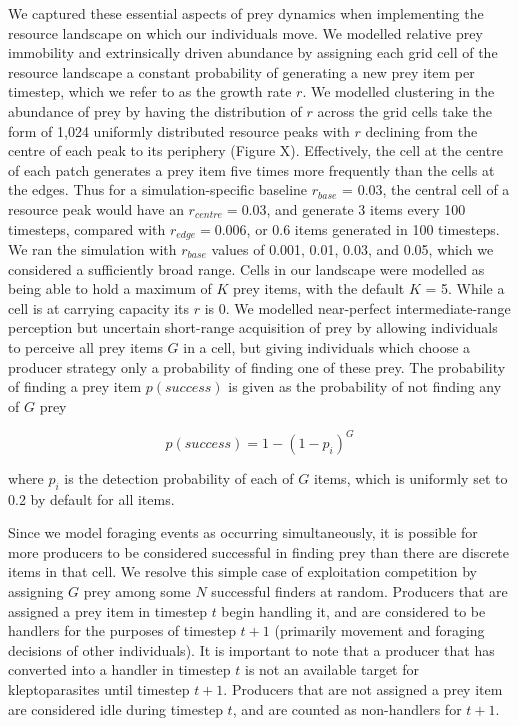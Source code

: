 \documentclass[11pt]{article}
\begin{document}
We captured these essential aspects of prey dynamics when implementing the resource landscape on which our individuals move.
We modelled relative prey immobility and extrinsically driven abundance by assigning each grid cell of the resource landscape a constant probability of generating a new prey item per timestep, which we refer to as the growth rate $r$.
We modelled clustering in the abundance of prey by having the distribution of $r$ across the grid cells take the form of 1,024 uniformly distributed resource peaks with $r$ declining from the centre of each peak to its periphery (Figure X).
Effectively, the cell at the centre of each patch generates a prey item five times more frequently than the cells at the edges.
Thus for a simulation-specific baseline $r_{base}$ = 0.03, the central cell of a resource peak  would have an $r_{centre} = 0.03$, and generate 3 items every 100 timesteps, compared with $r_{edge} = 0.006$, or 0.6 items generated in 100 timesteps.
We ran the simulation with $r_{base}$ values of 0.001, 0.01, 0.03, and 0.05, which we considered a sufficiently broad range. 
Cells in our landscape were modelled as being able to hold a maximum of $K$ prey items, with the default $K$ = 5.
While a cell is at carrying capacity its $r$ is 0.
We modelled near-perfect intermediate-range perception but uncertain short-range acquisition of prey by allowing individuals to perceive all prey items $G$ in a cell, but giving individuals which choose a producer strategy only a probability of finding one of these prey.
The probability of finding a prey item $p(success)$ is given as the probability of not finding any of $G$ prey
\begin{linenomath*}
    \begin{equation}
        p({success}) = 1 - \left(1 - p_i\right) ^ G
    \end{equation}
\end{linenomath*}
where $p_i$ is the detection probability of each of $G$ items, which is uniformly set to 0.2 by default for all items.

Since we model foraging events as occurring simultaneously, it is possible for more producers to be considered successful in finding prey than there are discrete items in that cell.
We resolve this simple case of exploitation competition by assigning $G$ prey among some $N$ successful finders at random.
Producers that are assigned a prey item in timestep $t$ begin handling it, and are considered to be handlers for the purposes of timestep $t+1$ (primarily movement and foraging decisions of other individuals).
It is important to note that a producer that has converted into a handler in timestep $t$ is not an available target for kleptoparasites until timestep $t+1$.
Producers that are not assigned a prey item are considered idle during timestep $t$, and are counted as non-handlers for $t+1$.
\end{document}
